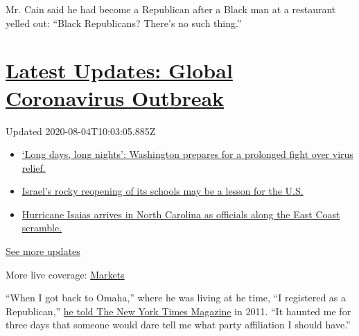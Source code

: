 Mr. Cain said he had become a Republican after a Black man at a
restaurant yelled out: ``Black Republicans? There's no such thing.''

\hypertarget{latest-updates-global-coronavirus-outbreak}{%
\section{\texorpdfstring{\href{https://www.nytimes3xbfgragh.onion/2020/08/04/world/coronavirus-covid-19.html?action=click\&pgtype=Article\&state=default\&region=MAIN_CONTENT_1\&context=storylines_live_updates}{Latest
Updates: Global Coronavirus
Outbreak}}{Latest Updates: Global Coronavirus Outbreak}}\label{latest-updates-global-coronavirus-outbreak}}

Updated 2020-08-04T10:03:05.885Z

\begin{itemize}
\tightlist
\item
  \href{https://www.nytimes3xbfgragh.onion/2020/08/04/world/coronavirus-covid-19.html?action=click\&pgtype=Article\&state=default\&region=MAIN_CONTENT_1\&context=storylines_live_updates\#link-6b644638}{`Long
  days, long nights': Washington prepares for a prolonged fight over
  virus relief.}
\item
  \href{https://www.nytimes3xbfgragh.onion/2020/08/04/world/coronavirus-covid-19.html?action=click\&pgtype=Article\&state=default\&region=MAIN_CONTENT_1\&context=storylines_live_updates\#link-7af9fca0}{Israel's
  rocky reopening of its schools may be a lesson for the U.S.}
\item
  \href{https://www.nytimes3xbfgragh.onion/2020/08/04/world/coronavirus-covid-19.html?action=click\&pgtype=Article\&state=default\&region=MAIN_CONTENT_1\&context=storylines_live_updates\#link-33bf9168}{Hurricane
  Isaias arrives in North Carolina as officials along the East Coast
  scramble.}
\end{itemize}

\href{https://www.nytimes3xbfgragh.onion/2020/08/04/world/coronavirus-covid-19.html?action=click\&pgtype=Article\&state=default\&region=MAIN_CONTENT_1\&context=storylines_live_updates}{See
more updates}

More live coverage:
\href{https://www.nytimes3xbfgragh.onion/live/2020/08/04/business/stock-market-today-coronavirus?action=click\&pgtype=Article\&state=default\&region=MAIN_CONTENT_1\&context=storylines_live_updates}{Markets}

``When I got back to Omaha,'' where he was living at he time, ``I
registered as a Republican,''
\href{https://www.nytimes3xbfgragh.onion/2011/07/03/magazine/herman-cain-talks-about-herman-cain.html}{he
told The New York Times Magazine} in 2011. ``It haunted me for three
days that someone would dare tell me what party affiliation I should
have.''

